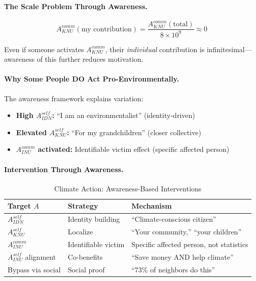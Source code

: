 \paragraph{The Scale Problem Through Awareness.}
\begin{equation}
A^{comm}_{KNU}(\text{my contribution}) = \frac{A^{comm}_{KNU}(\text{total})}{8 \times 10^9} \approx 0
\end{equation}

Even if someone activates $A^{comm}_{KNU}$, their \emph{individual} 
contribution is infinitesimal---awareness of this further reduces motivation.

\paragraph{Why Some People DO Act Pro-Environmentally.}
The awareness framework explains variation:

\begin{itemize}
\item \textbf{High $A^{self}_{IDN}$:} ``I am an environmentalist'' (identity-driven)
\item \textbf{Elevated $A^{self}_{KNU}$:} ``For my grandchildren'' (closer collective)
\item \textbf{$A^{comm}_{INU}$ activated:} Identifiable victim effect (specific 
affected person)
\end{itemize}

\paragraph{Intervention Through Awareness.}

\begin{table}[htbp]
\centering
\caption{Climate Action: Awareness-Based Interventions}
\label{tab:climate-intervention}
\renewcommand{\arraystretch}{1.3}
\begin{tabular}{@{}lll@{}}
\toprule
\textbf{Target $A$} & \textbf{Strategy} & \textbf{Mechanism} \\
\midrule
$A^{self}_{IDN}$ & Identity building & ``Climate-conscious citizen'' \\
$A^{self}_{KNU}$ & Localize & ``Your community,'' ``your children'' \\
$A^{comm}_{INU}$ & Identifiable victim & Specific affected person, not statistics \\
$A^{self}_{INU}$ alignment & Co-benefits & ``Save money AND help climate'' \\
Bypass via social & Social proof & ``73\% of neighbors do this'' \\
\bottomrule
\end{tabular}
\end{table}


